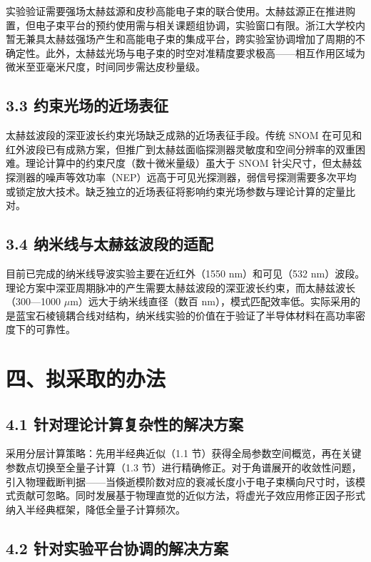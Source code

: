 \documentclass[a4paper,12pt]{ctexart}
\begin{document}
实验验证需要强场太赫兹源和皮秒高能电子束的联合使用。太赫兹源正在推进购置，但电子束平台的预约使用需与相关课题组协调，实验窗口有限。浙江大学校内暂无兼具太赫兹强场产生和高能电子束的集成平台，跨实验室协调增加了周期的不确定性。此外，太赫兹光场与电子束的时空对准精度要求极高——相互作用区域为微米至亚毫米尺度，时间同步需达皮秒量级。

\subsection{3.3 约束光场的近场表征}

太赫兹波段的深亚波长约束光场缺乏成熟的近场表征手段。传统 SNOM 在可见和红外波段已有成熟方案，但推广到太赫兹面临探测器灵敏度和空间分辨率的双重困难。理论计算中的约束尺度（数十微米量级）虽大于 SNOM 针尖尺寸，但太赫兹探测器的噪声等效功率（NEP）远高于可见光探测器，弱信号探测需要多次平均或锁定放大技术。缺乏独立的近场表征将影响约束光场参数与理论计算的定量比对。

\subsection{3.4 纳米线与太赫兹波段的适配}

目前已完成的纳米线导波实验主要在近红外（1550 nm）和可见（532 nm）波段。理论方案中深亚周期脉冲的产生需要太赫兹波段的深亚波长约束，而太赫兹波长（300—1000 $\mu$m）远大于纳米线直径（数百 nm），模式匹配效率低。实际采用的是蓝宝石棱镜耦合线对结构，纳米线实验的价值在于验证了半导体材料在高功率密度下的可靠性。

\section{四、拟采取的办法}

\subsection{4.1 针对理论计算复杂性的解决方案}

采用分层计算策略：先用半经典近似（1.1 节）获得全局参数空间概览，再在关键参数点切换至全量子计算（1.3 节）进行精确修正。对于角谱展开的收敛性问题，引入物理截断判据——当倏逝模阶数对应的衰减长度小于电子束横向尺寸时，该模式贡献可忽略。同时发展基于物理直觉的近似方法，将虚光子效应用修正因子形式纳入半经典框架，降低全量子计算频次。

\subsection{4.2 针对实验平台协调的解决方案}
\end{document}
